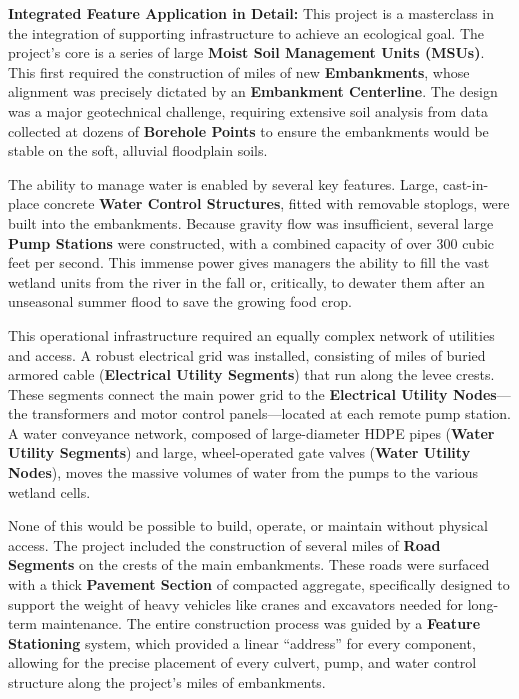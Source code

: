 \documentclass[
  letterpaper,
  DIV=11,
  numbers=noendperiod]{scrreprt}
\begin{document}
\textbf{Integrated Feature Application in Detail:} This project is a
masterclass in the integration of supporting infrastructure to achieve
an ecological goal. The project's core is a series of large
\textbf{Moist Soil Management Units (MSUs)}. This first required the
construction of miles of new \textbf{Embankments}, whose alignment was
precisely dictated by an \textbf{Embankment Centerline}. The design was
a major geotechnical challenge, requiring extensive soil analysis from
data collected at dozens of \textbf{Borehole Points} to ensure the
embankments would be stable on the soft, alluvial floodplain soils.

The ability to manage water is enabled by several key features. Large,
cast-in-place concrete \textbf{Water Control Structures}, fitted with
removable stoplogs, were built into the embankments. Because gravity
flow was insufficient, several large \textbf{Pump Stations} were
constructed, with a combined capacity of over 300 cubic feet per second.
This immense power gives managers the ability to fill the vast wetland
units from the river in the fall or, critically, to dewater them after
an unseasonal summer flood to save the growing food crop.

This operational infrastructure required an equally complex network of
utilities and access. A robust electrical grid was installed, consisting
of miles of buried armored cable (\textbf{Electrical Utility Segments})
that run along the levee crests. These segments connect the main power
grid to the \textbf{Electrical Utility Nodes}---the transformers and
motor control panels---located at each remote pump station. A water
conveyance network, composed of large-diameter HDPE pipes (\textbf{Water
Utility Segments}) and large, wheel-operated gate valves (\textbf{Water
Utility Nodes}), moves the massive volumes of water from the pumps to
the various wetland cells.

None of this would be possible to build, operate, or maintain without
physical access. The project included the construction of several miles
of \textbf{Road Segments} on the crests of the main embankments. These
roads were surfaced with a thick \textbf{Pavement Section} of compacted
aggregate, specifically designed to support the weight of heavy vehicles
like cranes and excavators needed for long-term maintenance. The entire
construction process was guided by a \textbf{Feature Stationing} system,
which provided a linear ``address'' for every component, allowing for
the precise placement of every culvert, pump, and water control
structure along the project's miles of embankments.
\end{document}
